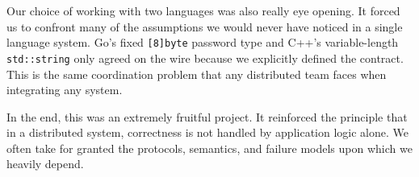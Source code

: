 \documentclass[9pt,a4paper]{article}
\begin{document}
Our choice of working with two languages was also really eye opening.
It forced us to confront many of the assumptions we would never have noticed in a single language system.
Go's fixed \texttt{[8]byte} password type and C++'s variable-length \texttt{std::string} only agreed on the wire because we explicitly defined the contract. 
This is the same coordination problem that any distributed team faces when integrating any system.

In the end, this was an extremely fruitful project. 
It reinforced the principle that in a distributed system, correctness is not handled by application logic alone. 
We often take for granted the protocols, semantics, and failure models upon which we heavily depend.
 
\end{document}

